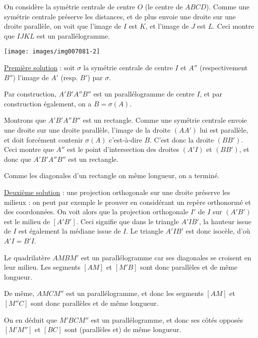 \begin{Soln}{24}
On considère la symétrie centrale  de centre $O$ (le centre de $ABCD$). Comme une symétrie centrale préserve les distances, et de plus envoie une droite sur une droite parallèle, on voit que l'image de $I$ est $K$, et l'image de $J$ est $L$. Ceci montre que $IJKL$ est un parallélogramme.

\end{Soln}
\begin{Soln}{25}
\begin{center}
\texttt{[image: images/img007081-2]}
\end{center}
\underline{Première solution} : soit $\sigma$ la symétrie centrale de centre $I$ et  $A''$ (respectivement $B''$) l'image de $A'$ (resp. $B'$) par $\sigma$.

Par construction, $A'B'A''B''$ est un parallélogramme de centre $I$, et par construction également, on a $B=\sigma(A)$.

Montrons que $A'B'A''B''$ est un rectangle. Comme une symétrie centrale envoie une droite sur une droite parallèle, l'image de la droite $(AA')$ lui est parallèle, et doit forcément contenir $\sigma(A)$ c'est-à-dire $B$. C'est donc la droite $(BB')$. Ceci montre que $A''$ est le point d'intersection des droites $(A'I)$ et $(BB')$, et donc que $A'B'A''B''$ est un rectangle.

Comme les diagonales d'un rectangle on même longueur, on a terminé.

\underline{Deuxième solution} : une projection orthogonale sur une droite préserve les milieux : on peut par exemple le prouver en considérant un repère orthonormé et des coordonnées. On voit alors que la  projection orthogonale $I'$ de $I$ sur $(A'B')$ est le milieu de $[A'B']$. Ceci signifie que dans le triangle $A'IB'$, la hauteur issue de $I$ est également la médiane issue de $I$. Le triangle $A'IB'$ est donc isocèle, d'où $A'I = B'I$.
\end{Soln}
\begin{Soln}{26}
Le quadrilatère $AMBM'$ est un parallélogramme car ses diagonales se croisent en leur milieu. Les segments $[AM]$ et $[M'B]$ sont donc parallèles et de même longueur.

De même, $AMCM''$ est un parallélogramme, et donc les segments $[AM]$ et $[M''C]$ sont donc parallèles et de même longueur.

On en déduit que $M'BCM''$ est un parallélogramme, et donc ses côtés opposés $[M'M'']$ et $[BC]$ sont (parallèles et) de même longueur.
\end{Soln}
